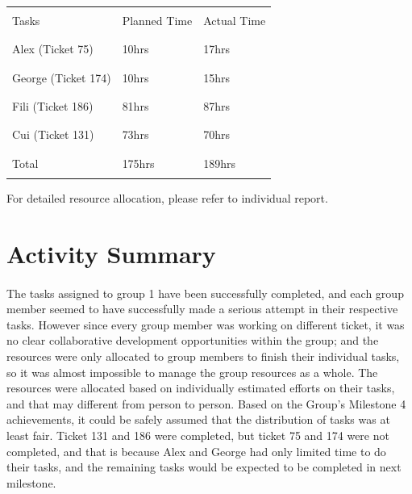 \documentclass[10pt,a4,oneside]{article}
\begin{document}
\begin{table}[ht!]
\begin{tabular}{|p{5cm}|p{1.5cm}|p{1.5cm}|} 
\hline
 & & \\
Tasks & Planned Time & Actual Time\\
 & & \\
\hline
 & & \\
Alex (Ticket 75) & 10hrs & 17hrs\\
 & & \\
\hline
 & & \\
George (Ticket 174) & 10hrs & 15hrs\\
 & & \\
\hline
 & & \\
Fili (Ticket 186) & 81hrs & 87hrs\\
 & & \\
\hline
 & & \\
Cui (Ticket 131) & 73hrs & 70hrs\\
 & & \\
\hline
 & & \\
Total & 175hrs & 189hrs\\
 & & \\
\hline
\end{tabular}
\end{table}

For detailed resource allocation, please refer to individual report.
\section{Activity Summary}

\paragraph{}
The tasks assigned to group 1 have been successfully completed, and each group member seemed to have successfully made a serious attempt in their respective tasks. However since every group member was working on different ticket, it was no clear collaborative development opportunities within the group; and the resources were only allocated to group members to finish their individual tasks, so it was almost impossible to manage the group resources as a whole. The resources were allocated based on individually estimated efforts on their tasks, and that may different from person to person. Based on the Group's Milestone 4 achievements, it could be safely assumed that the distribution of tasks was at least fair. Ticket 131 and 186 were completed, but ticket 75 and 174 were not completed, and that is because Alex and George had only limited time to do their tasks, and the remaining tasks would be expected to be completed in next milestone. 
\end{document}
